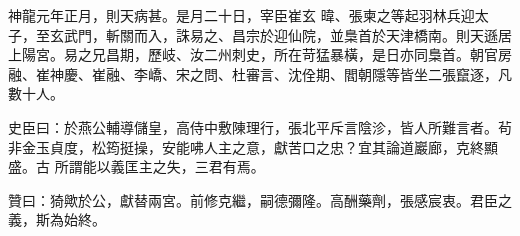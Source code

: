 \begin{pinyinscope}
 神龍元年正月，則天病甚。是月二十日，宰臣崔玄
 暐、張柬之等起羽林兵迎太子，至玄武門，斬關而入，誅易之、昌宗於迎仙院，並梟首於天津橋南。則天遜居上陽宮。易之兄昌期，歷岐、汝二州刺史，所在苛猛暴橫，是日亦同梟首。朝官房融、崔神慶、崔融、李嶠、宋之問、杜審言、沈佺期、閻朝隱等皆坐二張竄逐，凡數十人。



 史臣曰：於燕公輔導儲皇，高侍中敷陳理行，張北平斥言陰沴，皆人所難言者。茍非金玉貞度，松筠挺操，安能咈人主之意，獻苦口之忠？宜其論道巖廊，克終顯盛。古
 所謂能以義匡主之失，三君有焉。



 贊曰：猗歟於公，獻替兩宮。前修克繼，嗣德彌隆。高酬藥劑，張感宸衷。君臣之義，斯為始終。



\end{pinyinscope}